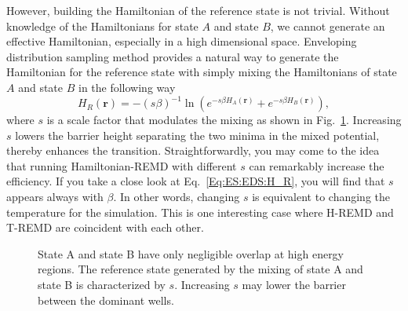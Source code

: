 However, building the Hamiltonian of the reference state is not trivial. Without knowledge of the Hamiltonians for state $A$ and state $B$, we cannot generate an effective Hamiltonian,
especially in a high dimensional space. Enveloping distribution sampling method provides a natural way to generate the Hamiltonian for the reference state with simply mixing the Hamiltonians of state $A$ and state $B$ in the following way
\begin{equation}
	H_R(\mathbf{r})=-\left(s\beta\right)^{-1}\ln{\left(e^{-s\beta H_A(\mathbf{r})}+e^{-s\beta H_B(\mathbf{r})}\right)},
	\label{Eq:ES:EDS:H_R}
\end{equation}
where $s$ is a scale factor that modulates the mixing\cite{ChristJCTC2009} as shown in Fig.~\ref{Fig:ES:EDS}. Increasing $s$ lowers the barrier height separating the two minima in the mixed potential, thereby enhances the transition. Straightforwardly, you may come to the idea that running Hamiltonian-REMD with different $s$ can remarkably increase the efficiency.
If you take a close look at Eq.~\ref{Eq:ES:EDS:H_R}, you will find that $s$ appears always with $\beta$. In other words, changing $s$ is equivalent to changing the temperature for the simulation. This is one interesting case where H-REMD and T-REMD are coincident with each other. 
\begin{figure}[htbp]
	\centering
	\caption{State A and state B have only negligible overlap at high energy regions. The reference state generated by the mixing of state A and state B is characterized by $s$. Increasing $s$ may lower the barrier between the dominant wells.}\label{Fig:ES:EDS}
\end{figure}

